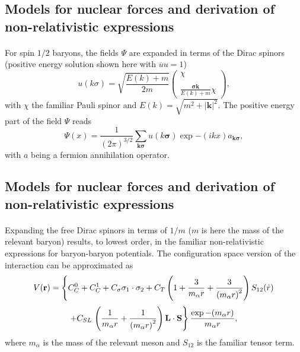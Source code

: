 \documentclass[%
twoside,                 %
final,                   %
10pt]{article}
\begin{document}
\subsection*{Models for nuclear forces and derivation of non-relativistic expressions}

\paragraph{}
For spin $1/2$ baryons, the fields $\Psi$ are expanded
in terms of the Dirac spinors (positive energy
solution shown here with $\overline{u}u=1$)
\[
   u(k\sigma)=\sqrt{\frac{E(k)+m}{2m}}
	  \left(\begin{array}{c} \chi\\ \\
	  \frac{\mathbf{\sigma}\mathbf{k}}{E(k)+m}\chi
	  \end{array}\right), 
\]
with $\chi$ the familiar Pauli spinor and $E(k) =\sqrt{m^2 +|\mathbf{k}|^2}$. 
The positive energy part of the field $\Psi$ reads
\[
\Psi (x)={\displaystyle \frac{1}{(2\pi )^{3/2}}
        \sum_{\mathbf{k}\mathbf{\sigma}}u(k\mathbf{\sigma})\exp{-(ikx)}a_{\mathbf{k}\mathbf{\sigma}}},
\]
with $a$ being a fermion annihilation operator.



\subsection*{Models for nuclear forces and derivation of non-relativistic expressions}

\paragraph{}
Expanding the free Dirac spinors
in terms of $1/m$ ($m$ is here the mass of the relevant baryon) 
results, to lowest order, in the familiar non-relativistic
expressions for baryon-baryon potentials.
The configuration space version of the interaction can be approximated as
\[
V(\mathbf{r})= \left\{ C^0_C + C^1_C + C_\sigma 
\mathbf{\sigma}_1\cdot\mathbf{\sigma}_2
 + C_T \left( 1 + {3\over m_\alpha r} + {3\over
\left(m_\alpha r\right)^2}
\right) S_{12} (\hat r)\right.
\]
\[
+ C_{SL}\left. \left( {1\over m_\alpha r} + {1\over \left( m_\alpha r\right)^2}
\right) \mathbf{L}\cdot \mathbf{S}
\right\} \frac{\exp{-(m_\alpha r)}}{m_\alpha r},
\]
where $m_{\alpha}$ is the mass of the relevant meson and
$S_{12}$ is the familiar tensor term.
\end{document}
